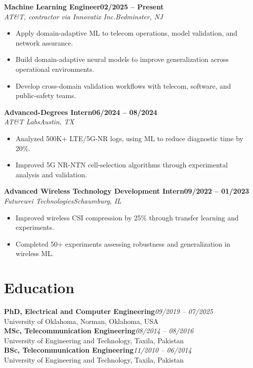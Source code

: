 \documentclass[9pt,letterpaper]{extarticle}
\newcommand{\role}[4]{\Needspace{4\baselineskip}\textbf{#1}\hfill\textbf{#2}\\[-1pt]\textit{#3}\hfill\textit{#4}\par}
\begin{document}
\role{Machine Learning Engineer}{02/2025 -- Present}{AT\&T, contractor via Innovatix Inc.}{Bedminster, NJ}
\begin{itemize}
\item Apply domain-adaptive ML to telecom operations, model validation, and network assurance.
\item Build domain-adaptive neural models to improve generalization across operational environments.
\item Develop cross-domain validation workflows with telecom, software, and public-safety teams.
\end{itemize}

\role{Advanced-Degrees Intern}{06/2024 -- 08/2024}{AT\&T Labs}{Austin, TX}
\begin{itemize}
\item Analyzed 500K+ LTE/5G-NR logs, using ML to reduce diagnostic time by 20\%.
\item Improved 5G NR-NTN cell-selection algorithms through experimental analysis and validation.
\end{itemize}

\role{Advanced Wireless Technology Development Intern}{09/2022 -- 01/2023}{Futurewei Technologies}{Schaumburg, IL}
\begin{itemize}
\item Improved wireless CSI compression by 25\% through transfer learning and experiments.
\item Completed 50+ experiments assessing robustness and generalization in wireless ML.
\end{itemize}

\section{Education}
\textbf{PhD, Electrical and Computer Engineering}\hfill\textit{09/2019 -- 07/2025}\\
University of Oklahoma, Norman, Oklahoma, USA\\
\textbf{MSc, Telecommunication Engineering}\hfill\textit{08/2014 -- 08/2016}\\
University of Engineering and Technology, Taxila, Pakistan\\
\textbf{BSc, Telecommunication Engineering}\hfill\textit{11/2010 -- 06/2014}\\
University of Engineering and Technology, Taxila, Pakistan
\end{document}
